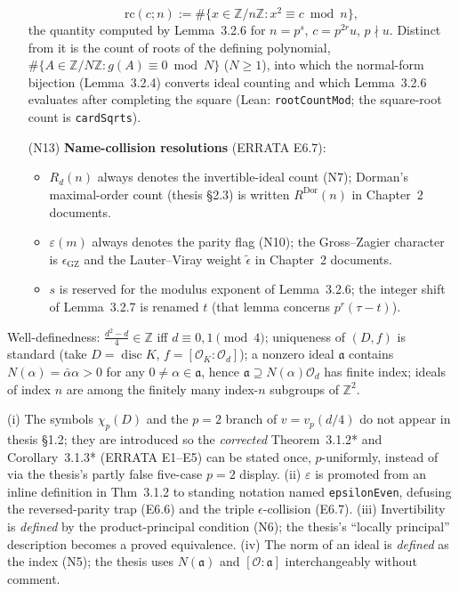 \begin{definition}
\begin{enumerate}
      \[
        \mathrm{rc}(c; n) := \#\{x \in \mathbb{Z}/n\mathbb{Z} : x^2 \equiv c \bmod n\},
      \]
      the quantity computed by Lemma~3.2.6 for $n = p^s$, $c = p^{2r}u$, $p \nmid u$.
      Distinct from it is the count of roots of the defining polynomial,
      $\#\{A \in \mathbb{Z}/N\mathbb{Z} : g(A) \equiv 0 \bmod N\}$ ($N \geq 1$), into
      which the normal-form bijection (Lemma~3.2.4) converts ideal counting and which
      Lemma~3.2.6 evaluates after completing the square (Lean:
      \texttt{rootCountMod}; the square-root count is \texttt{cardSqrts}).
    \item[(N13)] \textbf{Name-collision resolutions} (ERRATA E6.7):
      \begin{itemize}
        \item $R_d(n)$ always denotes the invertible-ideal count (N7); Dorman's
          maximal-order count (thesis \S 2.3) is written $R^{\mathrm{Dor}}(n)$ in
          Chapter~2 documents.
        \item $\varepsilon(m)$ always denotes the parity flag (N10); the Gross--Zagier
          character is $\epsilon_{\mathrm{GZ}}$ and the Lauter--Viray weight
          $\tilde\epsilon$ in Chapter~2 documents.
        \item $s$ is reserved for the modulus exponent of Lemma~3.2.6; the integer shift
          of Lemma~3.2.7 is renamed $t$ (that lemma concerns $p^r(\tau - t)$).
      \end{itemize}
  \end{enumerate}
  Well-definedness: $\frac{d^2 - d}{4} \in \mathbb{Z}$ iff $d \equiv 0, 1 \pmod 4$;
  uniqueness of $(D, f)$ is standard (take $D = \operatorname{disc} K$,
  $f = [\mathcal{O}_K : \mathcal{O}_d]$); a nonzero ideal $\mathfrak{a}$ contains
  $N(\alpha) = \bar\alpha\alpha > 0$ for any $0 \neq \alpha \in \mathfrak{a}$, hence
  $\mathfrak{a} \supseteq N(\alpha)\mathcal{O}_d$ has finite index; ideals of index $n$
  are among the finitely many index-$n$ subgroups of $\mathbb{Z}^2$.
\end{definition}

\begin{remark}
  \label{notation-divergence}
  (i) The symbols $\chi_p(D)$ and the $p = 2$ branch of $v = v_p(d/4)$ do not appear in
  thesis \S 1.2; they are introduced so the \emph{corrected} Theorem~3.1.2* and
  Corollary~3.1.3* (ERRATA E1--E5) can be stated once, $p$-uniformly, instead of via the
  thesis's partly false five-case $p = 2$ display.
  (ii) $\varepsilon$ is promoted from an inline definition in Thm~3.1.2 to standing
  notation named \texttt{epsilonEven}, defusing the reversed-parity trap (E6.6) and the
  triple $\epsilon$-collision (E6.7).
  (iii) Invertibility is \emph{defined} by the product-principal condition (N6); the
  thesis's ``locally principal'' description becomes a proved equivalence.
  (iv) The norm of an ideal is \emph{defined} as the index (N5); the thesis uses
  $N(\mathfrak{a})$ and $[\mathcal{O} : \mathfrak{a}]$ interchangeably without comment.
\end{remark}


